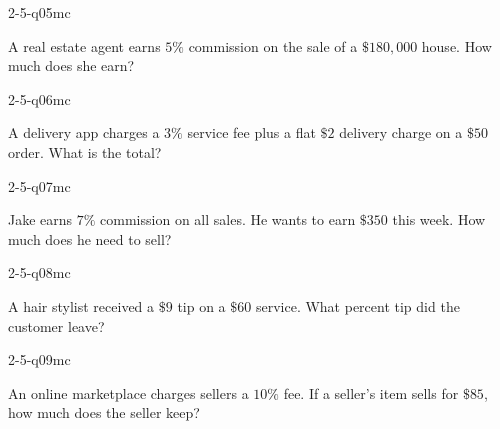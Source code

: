 \begin{practiceQuestion}{2-5-q05}{mc}
\begin{questionText}
A real estate agent earns $5\%$ commission on the sale of a $\$180{,}000$ house. How much does she earn?
\end{questionText}
\end{practiceQuestion}

\begin{practiceQuestion}{2-5-q06}{mc}
\begin{questionText}
A delivery app charges a $3\%$ service fee plus a flat $\$2$ delivery charge on a $\$50$ order. What is the total?
\end{questionText}
\end{practiceQuestion}

\begin{practiceQuestion}{2-5-q07}{mc}
\begin{questionText}
Jake earns $7\%$ commission on all sales. He wants to earn $\$350$ this week. How much does he need to sell?
\end{questionText}
\end{practiceQuestion}

\begin{practiceQuestion}{2-5-q08}{mc}
\begin{questionText}
A hair stylist received a $\$9$ tip on a $\$60$ service. What percent tip did the customer leave?
\end{questionText}
\end{practiceQuestion}

\begin{practiceQuestion}{2-5-q09}{mc}
\begin{questionText}
An online marketplace charges sellers a $10\%$ fee. If a seller's item sells for $\$85$, how much does the seller keep?
\end{questionText}
\end{practiceQuestion}

